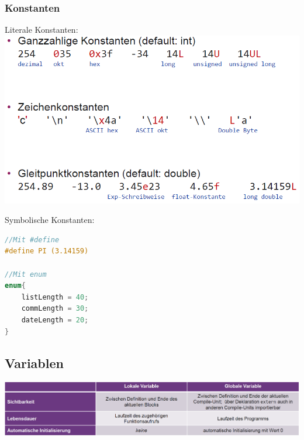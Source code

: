 		\subsubsection{Konstanten}
			\begin{minipage}{0.45\linewidth}
				Literale Konstanten:\\
				\includegraphics[width=1\linewidth]{Bilder/lit-konstanten.png}
			\end{minipage}
			\hfill
			\begin{minipage}{0.45\linewidth}
				Symbolische Konstanten:
				\begin{lstlisting}[language=C]
//Mit #define
#define PI (3.14159)

//Mit enum
enum{
	listLength = 40;
	commLength = 30;
	dateLength = 20;
}
				\end{lstlisting}
			\end{minipage}

	\subsection{Variablen}
		\begin{minipage}{1\linewidth}
			\includegraphics[width=1\linewidth]{Bilder/sichtbarkeit_variablen.png}
		\end{minipage}

